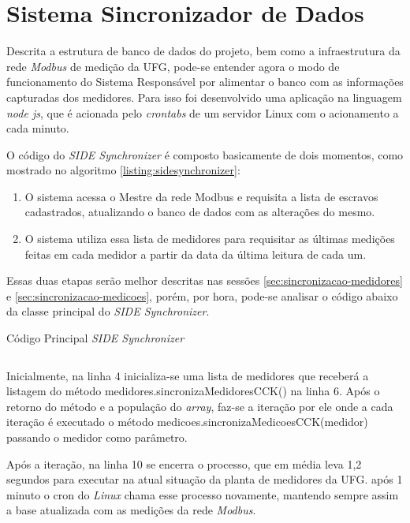 \chapter{Sistema Sincronizador de Dados}
\label{c:sistema_sincronizador_de_dados}
Descrita a estrutura de banco de dados do projeto, bem como a infraestrutura da rede \textit{Modbus} de medição da UFG, pode-se entender agora o modo de funcionamento do Sistema Responsável por alimentar o banco com as informações capturadas dos medidores. Para isso foi desenvolvido uma aplicação na linguagem \textit{node js}, que é acionada pelo \textit{crontabs} de um servidor Linux com o acionamento a cada minuto.

O código do \textit{SIDE Synchronizer} é composto basicamente de dois momentos, como mostrado no algoritmo \ref{listing:sidesynchronizer}:

\begin{enumerate}
    \item O sistema acessa o Mestre da rede Modbus e requisita a lista de escravos cadastrados, atualizando o banco de dados com as alterações do mesmo.
    \item O sistema utiliza essa lista de medidores para requisitar as últimas medições feitas em cada medidor a partir da data da última leitura de cada um.
\end{enumerate}

Essas duas etapas serão melhor descritas nas sessões \ref{sec:sincronizacao-medidores} e \ref{sec:sincronizacao-medicoes}, porém, por hora, pode-se analisar o código abaixo da classe principal do \textit{SIDE Synchronizer}.

\begin{listing}[ht]
\caption{Código Principal \textit{SIDE Synchronizer}}
\inputminted[frame=lines, 
    framesep=5mm, fontsize=\footnotesize, linenos=true, label={sidesynchronizer.js}]{js}{codigos/sidesynchronizer.js}
\label{listing:sidesynchronizer}
\end{listing}

Inicialmente, na linha 4 inicializa-se uma lista de medidores que receberá a listagem do método medidores.sincronizaMedidoresCCK() na linha 6. Após o retorno do método e a população do \textit{array}, faz-se a iteração por ele onde a cada iteração é executado o método medicoes.sincronizaMedicoesCCK(medidor) passando o medidor como parâmetro.

\newpage
Após a iteração, na linha 10 se encerra o processo, que em média leva 1,2 segundos para executar na atual situação da planta de medidores da UFG. após 1 minuto o cron do \textit{Linux} chama esse processo novamente, mantendo sempre assim a base atualizada com as medições da rede \textit{Modbus}.

